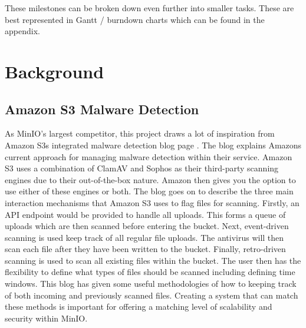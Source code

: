 \documentclass[12pt, conference, final, a4paper, onecolumn, compsoc]{IEEEtran}
\begin{document}
    These milestones can be broken down even further into smaller tasks. These are best
    represented in Gantt / burndown charts which can be found in the appendix.

    \section{Background}




    \subsection*{Amazon S3 Malware Detection} %

    As MinIO's largest competitor, this project draws a lot of inspiration from
    Amazon S3s integrated malware detection blog page \citep{amazon-md}. The
    blog explains Amazons current approach for managing malware detection within
    their service. Amazon S3 uses a combination of ClamAV and Sophos as their
    third-party scanning engines due to their out-of-the-box nature. Amazon then
    gives you the option to use either of these engines or both. The blog goes
    on to describe the three main interaction mechanisms that Amazon S3 uses to
    flag files for scanning. Firstly, an API endpoint would be provided to
    handle all uploads. This forms a queue of uploads which are then
    scanned before entering the bucket. Next, event-driven scanning is used keep
    track of all regular file uploads. The antivirus will then scan each file
    after they have been written to the bucket. Finally, retro-driven scanning
    is used to scan all existing files within the bucket. The user then has the
    flexibility to define what types of files should be scanned including
    defining time windows. This blog has given some useful methodologies of how
    to keeping track of both incoming and previously scanned files. Creating a
    system that can match these methods is important for offering a matching
    level of scalability and security within MinIO.
\end{document}
